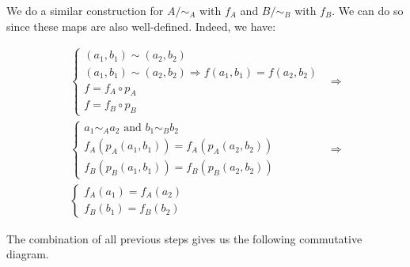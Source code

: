 We do a similar construction for $A/\sim_A$ with $f_A$ and $B/\sim_B$ with $f_B$. We can do so since these maps are also well-defined. Indeed, we have:

$$
\begin{array}{l}
	\left\{
	\begin{array}{l}
		(a_1, b_1) \sim (a_2, b_2) \\
		(a_1, b_1) \sim (a_2, b_2) \Rightarrow f(a_1, b_1) = f(a_2, b_2) \\
		f = f_A \circ p_A \\
		f = f_B \circ p_B
	\end{array}
	\right.
& \Rightarrow \\
	\left\{
	\begin{array}{l}
		a_1 \sim_A a_2 \text{ and } b_1 \sim_B b_2 \\
		f_A(p_A(a_1, b_1)) = f_A(p_A(a_2, b_2)) \\
		f_B(p_B(a_1, b_1)) = f_B(p_B(a_2, b_2)) 
	\end{array}
	\right.
& \Rightarrow \\
	\left\{
	\begin{array}{l}
		f_A(a_1) = f_A(a_2) \\
		f_B(b_1) = f_B(b_2) 
	\end{array}
	\right.
\end{array}
$$

The combination of all previous steps gives us the following commutative diagram.

